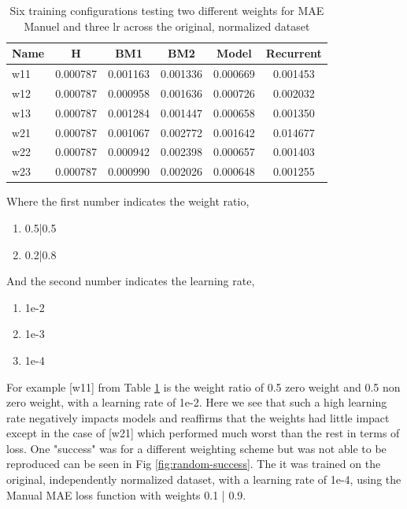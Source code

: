 \begin{table}[htbp]
	\centering
	\caption{Six training configurations testing two different weights for MAE Manuel and three lr across the original, normalized dataset}
	\label{tab:weighte_lr}
	\begin{tabular}{p{2cm}ccccc}
		\toprule
		Name &  H &  BM1 &  BM2 &  Model &  Recurrent \\
		\midrule
		w11 &       0.000787 &        0.001163 &        0.001336 &   0.000669 &            0.001453 \\
		w12 &       0.000787 &        0.000958 &        0.001636 &   0.000726 &            0.002032 \\
		w13 &       0.000787 &        0.001284 &        0.001447 &   0.000658 &            0.001350 \\
		w21 &       0.000787 &        0.001067 &        0.002772 &   0.001642 &            0.014677 \\
		w22 &       0.000787 &        0.000942 &        0.002398 &   0.000657 &            0.001403 \\
		w23 &       0.000787 &        0.000990 &        0.002026 &   0.000648 &            0.001255 \\
		\bottomrule
	\end{tabular}
\end{table}

Where the first number indicates the weight ratio,
\begin{enumerate}
	\item 0.5|0.5
	\item  0.2|0.8
\end{enumerate}

And the second number indicates the learning rate,
\begin{enumerate}
	\item  1e-2
	\item  1e-3
	\item  1e-4
\end{enumerate}
For example [w11] from Table \ref{tab:weighte_lr} is the weight ratio of 0.5 zero weight and 0.5 non zero weight, with a learning rate of 1e-2. Here we see that such a high learning rate negatively impacts models and reaffirms that the weights had little impact except in the case of [w21] which performed much worst than the rest in terms of loss. One "success" was for a different weighting scheme but was not able to be reproduced  can be seen in Fig \ref{fig:random-success}. The it was trained on the original, independently normalized dataset, with a learning rate of 1e-4, using the Manual MAE loss function with weights 0.1 | 0.9.

